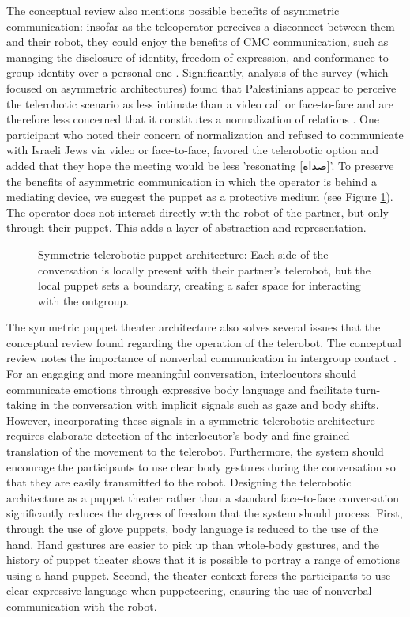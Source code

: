 \documentclass[dissertation,math,vertlayout,pdfa,colorlinks,nologo]{aaltoseries}
\begin{document}
The conceptual review also mentions possible benefits of asymmetric communication: insofar as the teleoperator perceives a disconnect between them and their robot, they could enjoy the benefits of CMC communication, such as managing the disclosure of identity, freedom of expression, and conformance to group identity over a personal one \cite[p. 78]{peledTelerobotContactHypothesis2022}. Significantly, analysis of the survey (which focused on asymmetric architectures) found that Palestinians appear to perceive the telerobotic scenario as less intimate than a video call or face-to-face and are therefore less concerned that it constitutes a normalization of relations \cite[p. 13]{peledTeleroboticIntergroupContact2024}. One participant who noted their concern of normalization and refused to communicate with Israeli Jews via video or face-to-face, favored the telerobotic option and added that they hope the meeting would be less 'resonating [\foreignlanguage{arabic}{صداه}]'. To preserve the benefits of asymmetric communication in which the operator is behind a mediating device, we suggest the puppet as a protective medium (see Figure \ref{fig:symmetric-telepuppetry}). The operator does not interact directly with the robot of the partner, but only through their puppet. This adds a layer of abstraction and representation.

\begin{figure}
    \centering
    
    \caption{Symmetric telerobotic puppet architecture: Each side of the conversation is locally present with their partner's telerobot, but the local puppet sets a boundary, creating a safer space for interacting with the outgroup.}
    \label{fig:symmetric-telepuppetry}
\end{figure}

The symmetric puppet theater architecture also solves several issues that the conceptual review found regarding the operation of the telerobot. The conceptual review notes the importance of nonverbal communication in intergroup contact \cite[p. 84]{peledTelerobotContactHypothesis2022}. For an engaging and more meaningful conversation, interlocutors should communicate emotions through expressive body language and facilitate turn-taking in the conversation with implicit signals such as gaze and body shifts. However, incorporating these signals in a symmetric telerobotic architecture requires elaborate detection of the interlocutor's body and fine-grained translation of the movement to the telerobot. Furthermore, the system should encourage the participants to use clear body gestures during the conversation so that they are easily transmitted to the robot. Designing the telerobotic architecture as a puppet theater rather than a standard face-to-face conversation significantly reduces the degrees of freedom that the system should process. First, through the use of glove puppets, body language is reduced to the use of the hand. Hand gestures are easier to pick up than whole-body gestures, and the history of puppet theater shows that it is possible to portray a range of emotions using a hand puppet. Second, the theater context forces the participants to use clear expressive language when puppeteering, ensuring the use of nonverbal communication with the robot.
\end{document}
